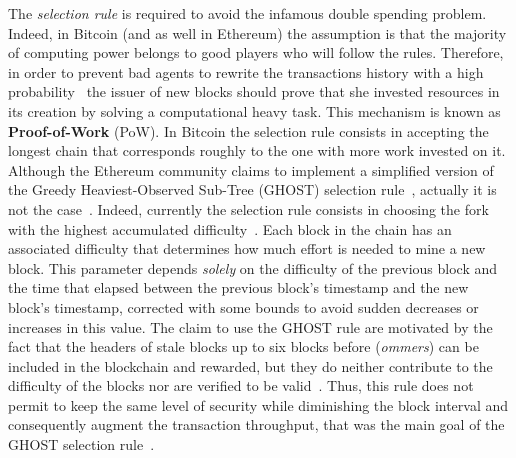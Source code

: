 The \emph{selection rule} is required to avoid the infamous double spending
problem. Indeed, in Bitcoin (and as well in Ethereum) the assumption is that the
majority of computing power belongs to good players who will follow the
rules. Therefore, in order to prevent bad agents
to rewrite the transactions history with a high probability~\cite{bib:bitcoin}
the issuer of new blocks should prove that she invested resources in its
creation
by solving a computational heavy task. This mechanism is known as
\textbf{Proof-of-Work} (PoW). In Bitcoin the selection rule consists in
accepting the longest chain that corresponds roughly to the one with more work
invested on it.
Although the Ethereum community claims to implement a simplified version of
the Greedy Heaviest-Observed Sub-Tree (GHOST) selection
rule~\cite{wood2018ethereum}, actually it is not the
case~\cite{bib:securityAndScalabilityPoW}.
Indeed, currently the selection rule consists in choosing the fork with the
highest accumulated difficulty~\cite{wood2018ethereum}. Each block in the
chain has an associated difficulty that determines how much effort is needed to
mine a new block. This parameter depends \emph{solely} on the difficulty of
the previous block and the time that elapsed between the previous block's 
timestamp and the new block's timestamp, corrected with some bounds to avoid 
sudden decreases or increases in this value. The claim to use the GHOST rule
are motivated by the fact that the headers of stale blocks up to six blocks
before 
(\emph{ommers}) can be included in the blockchain and rewarded, 
but they do neither contribute
to the difficulty of the blocks nor are verified to be 
valid~\cite{bib:securityAndScalabilityPoW}.
Thus, this rule does not permit to keep the same
level of security while diminishing the block interval and consequently
augment the transaction throughput, that was the main goal of the GHOST
selection rule~\cite{bib:ghost}.



